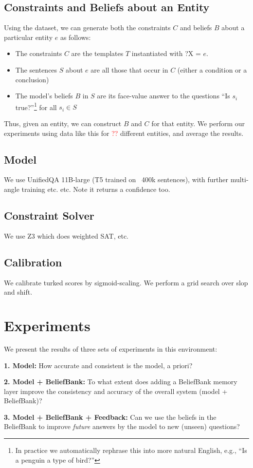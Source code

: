 \documentclass[11pt]{article}
\newcommand{\red}[1]{\textcolor{red}{#1}}
\newenvironment{ite}{                     %
     \parskip 0cm \begin{itemize} \parskip 0cm \parsep 0cm \itemsep 0cm \topsep 0cm}{
        \end{itemize}} %
\newenvironment{enu}{                   %
     \parskip 0cm \begin{list}{}{\parsep 0cm \itemsep 0cm \topsep 0cm}}{
       \end{list}} %
\begin{document}
\subsection{Constraints and Beliefs about an Entity}

Using the dataset, we can generate both the constraints $C$ and beliefs $B$ about a particular entity $e$ as follows:
\begin{ite}
\item The constraints $C$ are the templates $T$ instantiated with ?X = $e$.
\item The sentences $S$ about $e$ are all those that occur in $C$ (either a condition or a conclusion)
\item The model's beliefs $B$ in $S$ are its face-value answer to the questions ``Is $s_i$ true?''\footnote{In practice we automatically rephrase this into more natural English, e.g., ``Is a penguin a type of bird?''} for all $s_i \in S$
\end{ite}
Thus, given an entity, we can construct $B$ and $C$ for that entity. 
We perform our experiments using data like this for \red{??} different entities,
and average the results.

\subsection{Model}

We use UnifiedQA 11B-large (T5 trained on ~400k sentences), with further multi-angle training etc. etc.
Note it returns a confidence too.

\subsection{Constraint Solver}

We use Z3 which does weighted SAT, etc.

\subsection{Calibration \label{calibration}}

We calibrate turked scores by sigmoid-scaling. We perform a grid search over slop and shift.

\section{Experiments}

We present the results of three sets of experiments in this environment:
\begin{enu}
\item[{\bf 1. Model:}] How accurate and consistent is the model, a priori?
\item[{\bf 2. Model + BeliefBank:}] To what extent does adding a BeliefBank memory layer improve the consistency and accuracy
           of the overall system (model + BeliefBank)?
\item[{\bf 3. Model + BeliefBank + Feedback:}] Can we use the beliefs in the BeliefBank to improve {\it future} answers by the model
to new (unseen) questions?
\end{enu}
\end{document}
